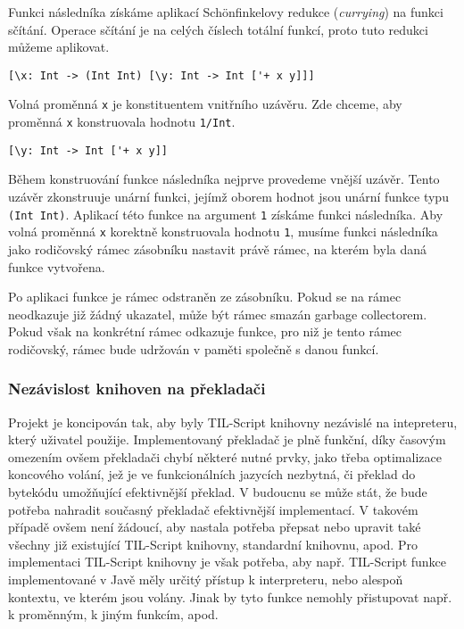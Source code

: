 Funkci následníka získáme aplikací Sch{\"o}nfinkelovy redukce (\textit{currying}) na funkci sčítání.
Operace sčítání je na celých číslech totální funkcí, proto tuto redukci můžeme aplikovat.

\begin{lstlisting}[caption={Vnější uzávěr}]
[\x: Int -> (Int Int) [\y: Int -> Int ['+ x y]]]
\end{lstlisting}

Volná proměnná \lstinline{x} je konstituentem vnitřního uzávěru. Zde chceme, aby proměnná
\lstinline{x} konstruovala hodnotu \lstinline{1/Int}.

\begin{lstlisting}[caption={Vnitřní uzávěr}]
[\y: Int -> Int ['+ x y]]
\end{lstlisting}

Během konstruování funkce následníka nejprve provedeme vnější uzávěr. Tento uzávěr zkonstruuje
unární funkci, jejímž oborem hodnot jsou unární funkce typu \lstinline{(Int Int)}. Aplikací této
funkce na argument \lstinline{1} získáme funkci následníka. Aby volná proměnná \lstinline{x}
korektně konstruovala hodnotu \lstinline{1}, musíme funkci následníka jako rodičovský rámec
zásobníku nastavit právě rámec, na kterém byla daná funkce vytvořena.

Po aplikaci funkce je rámec odstraněn ze zásobníku. Pokud se na rámec neodkazuje již žádný ukazatel,
může být rámec smazán garbage collectorem. Pokud však na konkrétní rámec odkazuje funkce, pro niž
je tento rámec rodičovský, rámec bude udržován v paměti společně s danou funkcí.

\subsubsection{Nezávislost knihoven na překladači}

Projekt je koncipován tak, aby byly TIL-Script knihovny nezávislé na intepreteru, který uživatel
použije. Implementovaný překladač je plně funkční, díky časovým omezením ovšem překladači chybí
některé nutné prvky, jako třeba optimalizace koncového volání, jež je ve funkcionálních
jazycích nezbytná, či překlad do bytekódu umožňující efektivnější překlad. V budoucnu se může stát,
že bude potřeba nahradit současný překladač efektivnější implementací. V takovém případě ovšem není
žádoucí, aby nastala potřeba přepsat nebo upravit také všechny již existující TIL-Script knihovny,
standardní knihovnu, apod. Pro implementaci TIL-Script knihovny je však potřeba, aby např.
TIL-Script funkce implementované v Javě měly určitý přístup k interpreteru, nebo alespoň kontextu,
ve kterém jsou volány. Jinak by tyto funkce nemohly přistupovat např. k proměnným, k jiným funkcím,
apod.

